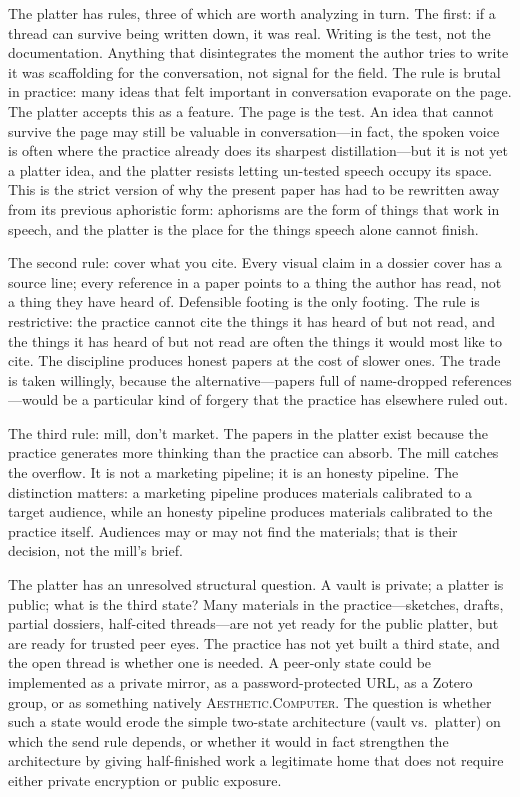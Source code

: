 \documentclass[10pt,letterpaper,twocolumn]{article}
\newcommand{\ac}{\textsc{Aesthetic.Computer}}
\begin{document}
The platter has rules, three of which are worth analyzing in turn. The first: if a thread can survive being written down, it was real. Writing is the test, not the documentation. Anything that disintegrates the moment the author tries to write it was scaffolding for the conversation, not signal for the field. The rule is brutal in practice: many ideas that felt important in conversation evaporate on the page. The platter accepts this as a feature. The page is the test. An idea that cannot survive the page may still be valuable in conversation---in fact, the spoken voice is often where the practice already does its sharpest distillation---but it is not yet a platter idea, and the platter resists letting un-tested speech occupy its space. This is the strict version of why the present paper has had to be rewritten away from its previous aphoristic form: aphorisms are the form of things that work in speech, and the platter is the place for the things speech alone cannot finish.

The second rule: cover what you cite. Every visual claim in a dossier cover has a source line; every reference in a paper points to a thing the author has read, not a thing they have heard of. Defensible footing is the only footing. The rule is restrictive: the practice cannot cite the things it has heard of but not read, and the things it has heard of but not read are often the things it would most like to cite. The discipline produces honest papers at the cost of slower ones. The trade is taken willingly, because the alternative---papers full of name-dropped references---would be a particular kind of forgery that the practice has elsewhere ruled out.

The third rule: mill, don't market. The papers in the platter exist because the practice generates more thinking than the practice can absorb. The mill catches the overflow. It is not a marketing pipeline; it is an honesty pipeline. The distinction matters: a marketing pipeline produces materials calibrated to a target audience, while an honesty pipeline produces materials calibrated to the practice itself. Audiences may or may not find the materials; that is their decision, not the mill's brief.

The platter has an unresolved structural question. A vault is private; a platter is public; what is the third state? Many materials in the practice---sketches, drafts, partial dossiers, half-cited threads---are not yet ready for the public platter, but are ready for trusted peer eyes. The practice has not yet built a third state, and the open thread is whether one is needed. A peer-only state could be implemented as a private mirror, as a password-protected URL, as a Zotero group, or as something natively \ac{}. The question is whether such a state would erode the simple two-state architecture (vault vs.\ platter) on which the send rule depends, or whether it would in fact strengthen the architecture by giving half-finished work a legitimate home that does not require either private encryption or public exposure.
\end{document}
